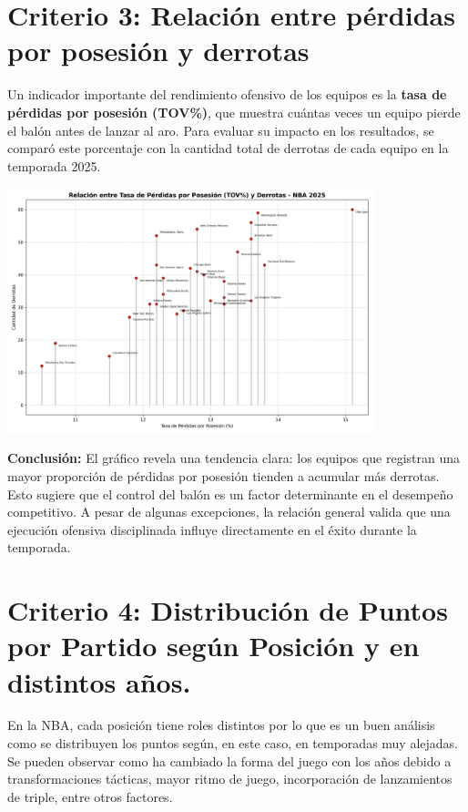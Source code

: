\documentclass[12pt]{article}
\begin{document}
\section*{Criterio 3: Relación entre pérdidas por posesión y derrotas}

Un indicador importante del rendimiento ofensivo de los equipos es la \textbf{tasa de pérdidas por posesión (TOV\%)}, que muestra cuántas veces un equipo pierde el balón antes de lanzar al aro. Para evaluar su impacto en los resultados, se comparó este porcentaje con la cantidad total de derrotas de cada equipo en la temporada 2025.

\begin{center}
    \includegraphics[width=0.8\textwidth]{lollipop_plot_tov_vs_derrotas.png}
\end{center}

\textbf{Conclusión:} El gráfico revela una tendencia clara: los equipos que registran una mayor proporción de pérdidas por posesión tienden a acumular más derrotas. Esto sugiere que el control del balón es un factor determinante en el desempeño competitivo. A pesar de algunas excepciones, la relación general valida que una ejecución ofensiva disciplinada influye directamente en el éxito durante la temporada.

\section*{Criterio 4: Distribución de Puntos por Partido según Posición y en distintos años.}

En la NBA, cada posición tiene roles distintos por lo que es un buen análisis como se distribuyen los puntos según, en este caso, en temporadas muy alejadas. Se pueden observar como ha cambiado la forma del juego con los años debido a transformaciones tácticas, mayor ritmo de juego, incorporación de lanzamientos de triple, entre otros factores.
\end{document}
